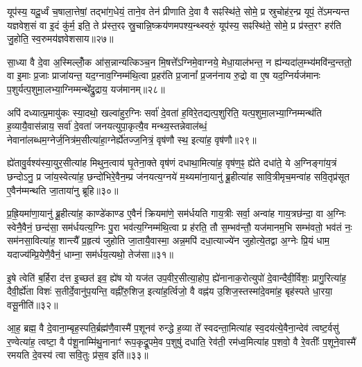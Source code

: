 यूप॑स्य॒ यदू॒र्ध्वं च॒षाला॒त्तेषां॒ तद्भा॑ग॒धेयं॒ ताने॒व तेन॑ प्रीणाति दे॒वा वै सꣴस्थि॑ते॒ सोमे॒ प्र स्रुचोह॑र॒न्प्र यूपं॒ ते॑\-ऽमन्यन्त यज्ञवेश॒सं वा इ॒दं कु॑र्म॒ इति॒ ते प्र॑स्त॒रꣴ स्रु॒चान्नि॒ष्क्रय॑णमपश्य॒न्थ्स्वरुं॒ यूप॑स्य॒ सꣴस्थि॑ते॒ सोमे॒ प्र प्र॑स्त॒रꣳ हर॑ति जु॒होति॒ स्व॒रुमय॑ज्ञवेशसाय॥२७॥

{}%

सा॒ध्या वै दे॒वा अ॒स्मिल्लोँ॒क आ॑स॒न्नान्यत्किञ्च॒न मि॒षत्ते᳚\-ऽग्निमे॒वाग्नये॒ मेधा॒याल॑भन्त॒ न ह्य॑न्यदा॑ल॒म्भ्य॑मवि॑न्द॒न्ततो॒ वा इ॒माः प्र॒जाः प्राजा॑यन्त॒ यद॒ग्नाव॒ग्निम्म॑थि॒त्वा प्र॒हर॑ति प्र॒जानां᳚ प्र॒जन॑नाय रु॒द्रो वा ए॒ष यद॒ग्निर्यज॑मानः प॒शुर्यत्प॒शुमा॒लभ्या॒ग्निम्मन्थे᳚द्रु॒द्राय॒ यज॑मानम्॥२८॥

अपि॑ दध्यात्प्र॒मायु॑कः स्या॒दथो॒ खल्वा॑हुर॒ग्निः सर्वा॑ दे॒वता॑ ह॒विरे॒तद्यत्प॒शुरिति॒ यत्प॒शुमा॒लभ्या॒ग्निम्मन्थ॑ति ह॒व्यायै॒वास॑न्नाय॒ सर्वा॑ दे॒वता॑ जनयत्युपा॒कृत्यै॒व मन्थ्य॒स्तन्नेवाल॑ब्धं॒ नेवाना॑लब्धम॒ग्नेर्ज॒नित्र॑म॒सीत्या॑हा॒ग्नेर्\mbox{}ह्ये॑तज्ज॒नित्रं॒ वृष॑णौ स्थ॒ इत्या॑ह॒ वृष॑णौ॥२९॥

ह्ये॑तावु॒र्वश्य॑स्या॒युर॒सीत्या॑ह मिथुन॒त्वाय॑ घृ॒तेना॒क्ते वृष॑णं दधाथा॒मित्या॑ह॒ वृष॑ण॒ꣴ॒ ह्ये॑ते दधा॑ते॒ ये अ॒ग्निङ्गा॑य॒त्रं छन्दो\-ऽनु॒ प्र जा॑य॒स्वेत्या॑ह॒ छन्दो॑भिरे॒वैन॒म्प्र ज॑नयत्य॒ग्नये॑ म॒थ्यमा॑ना॒यानु॑ ब्रू॒हीत्या॑ह सावि॒त्रीमृच॒मन्वा॑ह सवि॒तृप्र॑सूत ए॒वैन॑म्मन्थति जा॒ताया॑नु ब्रूहि॥३०॥

प्र॒ह्रि॒यमा॑णा॒यानु॑ ब्रू॒हीत्या॑ह॒ काण्डे॑काण्ड ए॒वैनं॑ क्रियमा॑णे॒ सम॑र्धयति गाय॒त्रीः सर्वा॒ अन्वा॑ह गाय॒त्रछ॑न्दा॒ वा अ॒ग्निः स्वेनै॒वैनं॒ छन्द॑सा॒ सम॑र्धयत्य॒ग्निः पु॒रा भव॑त्य॒ग्निम्म॑थि॒त्वा प्र ह॑रति॒ तौ स॒म्भव॑न्तौ॒ यज॑मानम॒भि सम्भ॑वतो॒ भव॑तं नः॒ सम॑नसा॒वित्या॑ह॒ शान्त्यै᳚ प्र॒हृत्य॑ जुहोति जा॒तायै॒वास्मा॒ अन्न॒मपि॑ दधा॒त्याज्ये॑न जुहोत्ये॒तद्वा अ॒ग्नेः प्रि॒यं धाम॒ यदाज्य॑म्प्रि॒येणै॒वैनं॒ धाम्ना॒ सम॑र्धय॒त्यथो॒ तेज॑सा॥३१॥

{\anuvakamend[{यज॑मानमाह॒ वृष॑णौ जाता॒यानु॑ब्रू॒ह्यप्य॒ष्टाद॑श च}]}%

इ॒षे त्वेति॑ ब॒र्\mbox{}हिरा द॑त्त इ॒च्छत॑ इव॒ ह्ये॑ष यो यज॑त उप॒वीर॒सीत्या॒होप॒ ह्ये॑नानाक॒रोत्युपो॑ दे॒वान्दैवी॒र्विशः॒ प्रागु॒रित्या॑ह॒ दैवी॒र्\mbox{}ह्ये॑ता विशः॑ स॒तीर्दे॒वानु॑प॒यन्ति॒ वह्नी॑रु॒शिज॒ इत्या॑ह॒र्त्विजो॒ वै वह्न॑य उ॒शिज॒स्तस्मा॑दे॒वमा॑ह॒ बृह॑स्पते धा॒रया॒ वसू॒नीति॑॥३२॥

आ॒ह॒ ब्रह्म॒ वै दे॒वाना॒म्बृह॒स्पति॒र्ब्रह्म॑णै॒वास्मै॑ प॒शूनव॑ रुन्द्धे ह॒व्या ते᳚ स्वदन्ता॒मित्या॑ह स्व॒दय॑त्ये॒वैना॒न्देव॑ त्वष्ट॒र्वसु॑ र॒ण्वेत्या॑ह॒ त्वष्टा॒ वै प॑शू॒नाम्मि॑थु॒नानाꣳ॑ रूप॒कृद्रू॒पमे॒व प॒शुषु॑ दधाति॒ रेव॑ती॒ रम॑ध्व॒मित्या॑ह प॒शवो॒ वै रे॒वतीः᳚ प॒शूने॒वास्मै॑ रमयति दे॒वस्य॑ त्वा सवि॒तुः प्र॑स॒व इति॑॥३३॥

